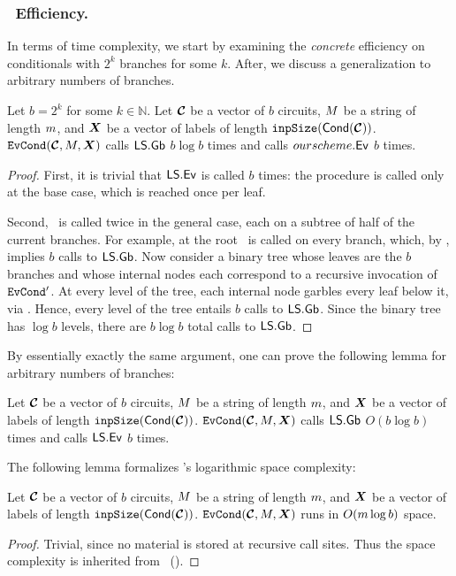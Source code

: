 \subsubsection{\evcond\ Efficiency.}
In terms of time complexity, we start by examining the \emph{concrete}
efficiency on conditionals with $2^k$ branches for some $k$.
%
After, we discuss a generalization to arbitrary numbers of branches.

\begin{lemma}\label{lemma:evcondtime}
  Let $b = 2^k$ for some $k \in \mathbb{N}$.
  Let $\vec{\cir}$ be a vector of $b$ circuits, $M$ be a string of
  length $m$, and $\gcirinp$ be a vector of labels of length
  $\inpsize(\conditional(\vec{\cir}))$.
  $\evcond(\vec{\cir}, \mat, \gcirinp)$ calls $\textsf{LS}.\textsf{Gb}$ $b \log b$ times
  and calls $ourscheme.\textsf{Ev}$ $b$ times.
\end{lemma}
\begin{proof}
  First, it is trivial that $\textsf{LS}.\textsf{Ev}$ is called $b$ times: the
  procedure is called only at the base case, which is reached once per
  leaf.

  Second, \gbtree\ is called twice in the general case, each on a
  subtree of half of the current branches.
  For example, at the root \gbtree\ is called on every branch, which, by
  , implies $b$ calls to $\textsf{LS}.\mathsf{Gb}$.
  Now consider a binary tree whose leaves are the $b$
  branches and whose internal nodes each correspond to
  a recursive invocation of $\mathtt{EvCond}'$.
  At every level of the tree, each internal node garbles every
  leaf below it, via \gbtree.
  Hence, every level of the tree entails $b$ calls to $\textsf{LS}.\mathsf{Gb}$.
  Since the binary tree has $\log b$ levels, there are $b
  \log b$ total calls to $\textsf{LS}.\mathsf{Gb}$.
\end{proof}

By essentially exactly the same argument, one can prove the following
lemma for arbitrary numbers of branches:
\begin{lemma}\label{lemma:evcondtime-general}
  Let $\vec{\cir}$ be a vector of $b$ circuits, $M$ be a string of
  length $m$, and $\gcirinp$ be a vector of labels of length
  $\inpsize(\conditional(\vec{\cir}))$.
  $\evcond(\vec{\cir}, \mat, \gcirinp)$ calls $\textsf{LS}.\textsf{Gb}$ $O(b \log b)$ times
  and calls $\textsf{LS}.\textsf{Ev}$ $b$ times.
\end{lemma}

The following lemma formalizes \evcond's logarithmic space complexity:
\begin{lemma}\label{lemma:evcondspace}
  Let $\vec{\cir}$ be a vector of $b$ circuits, $M$ be a string of
  length $m$, and $\gcirinp$ be a vector of labels of length
  $\inpsize(\conditional(\vec{\cir}))$.
  $\evcond(\vec{\cir}, \mat, \gcirinp)$ runs in $O(m \log b)$ space.
\end{lemma}
\begin{proof}
  Trivial, since no material is stored at recursive call sites.
  Thus the space complexity is inherited from
  \gbtree~().
\end{proof}



